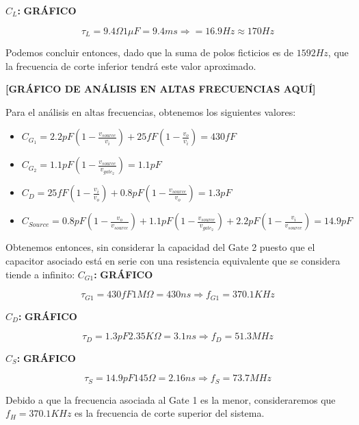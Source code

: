 \documentclass[a4paper, 10pt, spanish]{article}
\begin{document}
\textbf{$C_L$:}
\textbf{GRÁFICO}

\begin{equation}
  \tau_L = 9.4\Omega 1\mu F = 9.4ms \Rightarrow = 16.9 Hz \approx 170 Hz
\end{equation}

Podemos concluir entonces, dado que la suma de polos ficticios es de $1592Hz$, que la frecuencia de corte inferior tendrá este valor aproximado.

\textbf{[GRÁFICO DE ANÁLISIS EN ALTAS FRECUENCIAS AQUÍ]}

Para el análisis en altas frecuencias, obtenemos los siguientes valores:

\begin{itemize}
  \item $C_{G_1}=2.2pF(1-\frac{v_{source}}{v_i})+25fF(1-\frac{v_o}{v_i}) = 430fF$
  \item $C_{G_2}=1.1pF(1-\frac{v_{source}}{v_{gate_2}}) = 1.1pF$
  \item $C_{D}=25fF(1-\frac{v_i}{v_o})+0.8pF(1-\frac{v_{source}}{v_o}) = 1.3pF$
  \item $C_{Source}=0.8pF(1-\frac{v_o}{v_{source}})+1.1pF(1-\frac{v_{source}}{v_{gate_2}})+2.2pF(1-\frac{v_i}{v_{source}}) = 14.9pF$
\end{itemize}

Obtenemos entonces, sin considerar la capacidad del Gate 2 puesto que el capacitor asociado está en serie con una resistencia equivalente que se considera tiende a infinito:
\textbf{$C_{G1}$:}
\textbf{GRÁFICO}

\begin{equation}
  \tau_{G1} = 430fF 1M\Omega = 430ns \Rightarrow f_{G1} = 370.1 KHz
\end{equation}


\textbf{$C_{D}$:}
\textbf{GRÁFICO}

\begin{equation}
  \tau_{D} = 1.3pF 2.35K\Omega = 3.1ns \Rightarrow f_{D} = 51.3 MHz
\end{equation}

\textbf{$C_{S}$:}
\textbf{GRÁFICO}

\begin{equation}
  \tau_{S} = 14.9 pF 145\Omega = 2.16ns \Rightarrow f_{S} = 73.7 MHz
\end{equation}

Debido a que la frecuencia asociada al Gate 1 es la menor, consideraremos que $f_H=370.1KHz$ es la frecuencia de corte superior del sistema.
\end{document}
